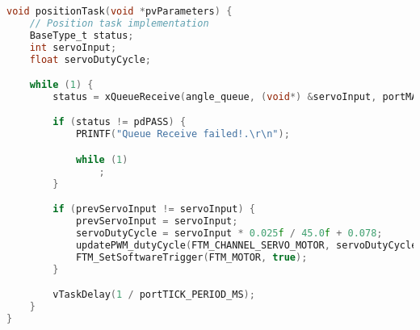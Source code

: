 \begin{lstlisting}[language=c,caption=Position Task, label=list:position]
void positionTask(void *pvParameters) {
    // Position task implementation
    BaseType_t status;
    int servoInput;
    float servoDutyCycle;

    while (1) {
        status = xQueueReceive(angle_queue, (void*) &servoInput, portMAX_DELAY);

        if (status != pdPASS) {
            PRINTF("Queue Receive failed!.\r\n");

            while (1)
                ;
        }

        if (prevServoInput != servoInput) {
            prevServoInput = servoInput;
            servoDutyCycle = servoInput * 0.025f / 45.0f + 0.078;
            updatePWM_dutyCycle(FTM_CHANNEL_SERVO_MOTOR, servoDutyCycle);
            FTM_SetSoftwareTrigger(FTM_MOTOR, true);
        }

        vTaskDelay(1 / portTICK_PERIOD_MS);
    }
}
\end{lstlisting}
